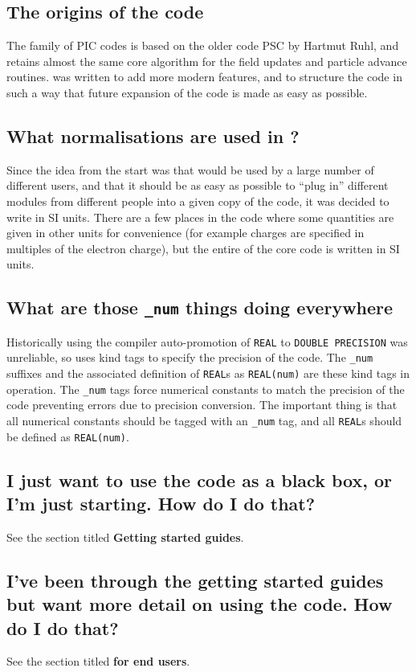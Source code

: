 \documentclass[12pt,a4paper]{article}
\newcommand{\code}[1]{{\texttt{#1}}}
\newcommand{\EPOCH}{{\color{warwickdark}\fontfamily{phv}\selectfont{EPOCH}}}
\begin{document}
\subsection{The origins of the code}
The {\EPOCH} family of PIC codes is based on the older code PSC by Hartmut Ruhl,
and retains almost the same core algorithm for the field updates and particle
advance routines. {\EPOCH} was written to add more modern features, and to
structure the code in such a way that future expansion of the code is made as
easy as possible.

\subsection{What normalisations are used in {\EPOCH}?}
Since the idea from the start was that {\EPOCH} would be used by a large number
of different users, and that it should be as easy as possible to ``plug in''
different modules from different people into a given copy of the code, it was
decided to write {\EPOCH} in SI units. There are a few places in the code where
some quantities are given in other units for convenience (for example charges
are specified in multiples of the electron charge), but the entire of the core
code is written in SI units.

\subsection{What are those \code{\_num} things doing everywhere}
Historically using the compiler auto-promotion of \code{REAL} to
\code{DOUBLE PRECISION} was unreliable, so {\EPOCH} uses kind tags to specify
the precision of the code. The \code{\_num} suffixes and the associated
definition of \code{REAL}s as \code{REAL(num)} are these kind tags in
operation. The \code{\_num} tags force numerical constants to match the
precision of the code preventing errors due to precision conversion. The
important thing is that all numerical constants should be tagged with an
\code{\_num} tag, and all \code{REAL}s should be defined as \code{REAL(num)}.

\subsection{I just want to use the code as a black box, or I'm just
  starting. How do I do that?}
See the section titled {\bf Getting started guides}.

\subsection{I've been through the getting started guides but want more detail
  on using the code. How do I do that?}
See the section titled {\bf {\EPOCH} for end users}.
\end{document}
